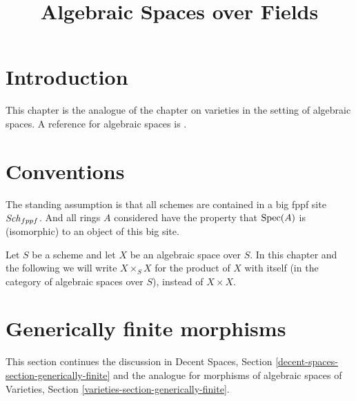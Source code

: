 

%


\title{Algebraic Spaces over Fields}


\maketitle

\label{section-phantom}

\tableofcontents

\section{Introduction}
\label{section-introduction}

\noindent
This chapter is the analogue of the chapter on varieties in the setting
of algebraic spaces. A reference for algebraic spaces is
\cite{Kn}.


\section{Conventions}
\label{section-conventions}

\noindent
The standing assumption is that all schemes are contained in
a big fppf site $\mathit{Sch}_{fppf}$. And all rings $A$ considered
have the property that $\mathop{\mathrm{Spec}}(A)$ is (isomorphic) to an
object of this big site.

\medskip\noindent
Let $S$ be a scheme and let $X$ be an algebraic space over $S$.
In this chapter and the following we will write $X \times_S X$
for the product of $X$ with itself (in the category of algebraic
spaces over $S$), instead of $X \times X$.



\section{Generically finite morphisms}
\label{section-generically-finite}

\noindent
This section continues the discussion in
Decent Spaces, Section \ref{decent-spaces-section-generically-finite}
and the analogue for morphisms of algebraic spaces of
Varieties, Section \ref{varieties-section-generically-finite}.

